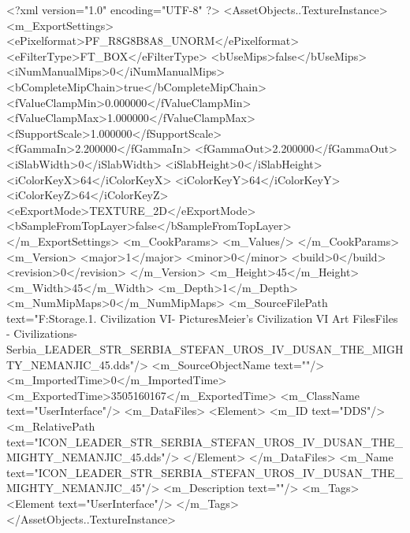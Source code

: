 <?xml version="1.0" encoding="UTF-8" ?>
<AssetObjects..TextureInstance>
	<m_ExportSettings>
		<ePixelformat>PF_R8G8B8A8_UNORM</ePixelformat>
		<eFilterType>FT_BOX</eFilterType>
		<bUseMips>false</bUseMips>
		<iNumManualMips>0</iNumManualMips>
		<bCompleteMipChain>true</bCompleteMipChain>
		<fValueClampMin>0.000000</fValueClampMin>
		<fValueClampMax>1.000000</fValueClampMax>
		<fSupportScale>1.000000</fSupportScale>
		<fGammaIn>2.200000</fGammaIn>
		<fGammaOut>2.200000</fGammaOut>
		<iSlabWidth>0</iSlabWidth>
		<iSlabHeight>0</iSlabHeight>
		<iColorKeyX>64</iColorKeyX>
		<iColorKeyY>64</iColorKeyY>
		<iColorKeyZ>64</iColorKeyZ>
		<eExportMode>TEXTURE_2D</eExportMode>
		<bSampleFromTopLayer>false</bSampleFromTopLayer>
	</m_ExportSettings>
	<m_CookParams>
		<m_Values/>
	</m_CookParams>
	<m_Version>
		<major>1</major>
		<minor>0</minor>
		<build>0</build>
		<revision>0</revision>
	</m_Version>
	<m_Height>45</m_Height>
	<m_Width>45</m_Width>
	<m_Depth>1</m_Depth>
	<m_NumMipMaps>0</m_NumMipMaps>
	<m_SourceFilePath text="F:\Mod Storage\2.1. Civilization VI\Mods\Archive - Pictures\Sid Meier's Civilization VI Art Files\Art Files - Civilizations\Civilization - Serbia\ICON_LEADER_STR_SERBIA_STEFAN_UROS_IV_DUSAN_THE_MIGHTY_NEMANJIC_45.dds"/>
	<m_SourceObjectName text=""/>
	<m_ImportedTime>0</m_ImportedTime>
	<m_ExportedTime>3505160167</m_ExportedTime>
	<m_ClassName text="UserInterface"/>
	<m_DataFiles>
		<Element>
			<m_ID text="DDS"/>
			<m_RelativePath text="ICON_LEADER_STR_SERBIA_STEFAN_UROS_IV_DUSAN_THE_MIGHTY_NEMANJIC_45.dds"/>
		</Element>
	</m_DataFiles>
	<m_Name text="ICON_LEADER_STR_SERBIA_STEFAN_UROS_IV_DUSAN_THE_MIGHTY_NEMANJIC_45"/>
	<m_Description text=""/>
	<m_Tags>
		<Element text="UserInterface"/>
	</m_Tags>
</AssetObjects..TextureInstance>

